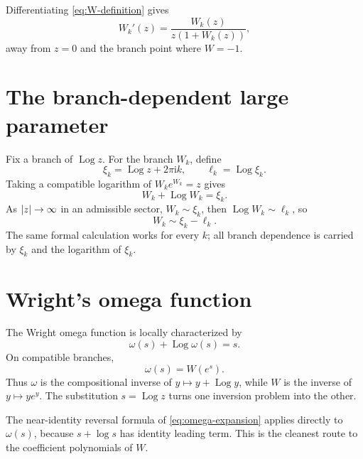 \documentclass[11pt,openany]{book}
\theoremstyle{definition}
\theoremstyle{plain}
\theoremstyle{remark}
\newcommand{\ii}{\mathrm{i}}
\DeclareMathOperator{\Log}{Log}
\DeclarePairedDelimiter{\abs}{\lvert}{\rvert}
\begin{document}
Differentiating \cref{eq:W-definition} gives
\begin{equation}\label{eq:W-derivative-exact}
 W_k'(z)=\frac{W_k(z)}{z(1+W_k(z))},
\end{equation}
away from \(z=0\) and the branch point where \(W=-1\).

\section{The branch-dependent large parameter}
Fix a branch of \(\Log z\). For the branch \(W_k\), define
\begin{equation}\label{eq:xi-k}
 \xi_k=\Log z+2\pi\ii k,
 \qquad
 \ell_k=\Log\xi_k.
\end{equation}
Taking a compatible logarithm of \(W_ke^{W_k}=z\) gives
\begin{equation}\label{eq:W-log-branch}
 W_k+\Log W_k=\xi_k.
\end{equation}
As \(\abs{z}\to\infty\) in an admissible sector, \(W_k\sim\xi_k\), then \(\Log W_k\sim\ell_k\), so
\begin{equation}\label{eq:W-leading-two}
 W_k\sim\xi_k-\ell_k.
\end{equation}
The same formal calculation works for every \(k\); all branch dependence is carried by \(\xi_k\) and the logarithm of \(\xi_k\).

\section{Wright's omega function}
The Wright omega function is locally characterized by
\begin{equation}\label{eq:omega-def}
 \omega(s)+\Log\omega(s)=s.
\end{equation}
On compatible branches,
\begin{equation}\label{eq:omega-W}
 \omega(s)=W(e^s).
\end{equation}
Thus \(\omega\) is the compositional inverse of \(y\mapsto y+\Log y\), while \(W\) is the inverse of \(y\mapsto ye^y\). The substitution \(s=\Log z\) turns one inversion problem into the other.

The near-identity reversal formula of \cref{eq:omega-expansion} applies directly to \(\omega(s)\), because \(s+\log s\) has identity leading term. This is the cleanest route to the coefficient polynomials of \(W\).
\end{document}

